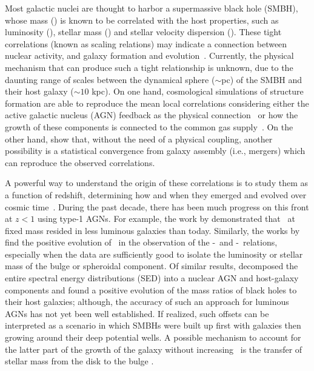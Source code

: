 \documentclass[apj]{emulateapj}
\begin{document}
Most galactic nuclei are thought to harbor a supermassive black hole (SMBH), whose mass (\mbh) is known to be correlated with the host properties, such as luminosity (\lhost), stellar mass (\smass) and stellar velocity dispersion (\sigstar). These tight correlations (known as scaling relations) may indicate a connection between nuclear activity, and galaxy formation and evolution~\citep[e.g.,][]{Mag++98, F+M00, M+H03, Gul++09,Beifi2012, H+R04, Geb++01b, Gra++2011}.
Currently, the physical mechanism that can produce such a tight relationship is unknown, due to the daunting range of scales between the dynamical sphere ($\sim$pc) of the SMBH and their host galaxy ($\sim10$ kpc). On one hand, cosmological simulations of structure formation are able to reproduce the mean local correlations considering either the active galactic nucleus (AGN) feedback as the physical connection~\citep{Springel2005, Hopkins2008, Matteo2008, DeG++15} or how the growth of these components is connected to the common gas supply~\citep{Cen2015, Menci2016}.
On the other hand, \citet{Peng2007, Jahnke2011, Hirschmann2010} show that, without the need of a physical coupling, another possibility is a statistical convergence from galaxy assembly (i.e., mergers) which can reproduce the observed correlations.

A powerful way to understand the origin of these correlations is to study them as a function of redshift, determining how and when they emerged and evolved over cosmic time~\citep[e.g.,][]{TMB04,Sal++06,Woo++06, Jah++09,SS13,Sun2015}. During the past decade, there has been much progress on this front at $z<1$ using type-1 AGNs. For example, the work by \citet{Park15, Tre++07, Pen++06qsob} demonstrated that \mbh\ at fixed mass resided in less luminous galaxies than today. Similarly, the works by \citet{Bennert11, Woo++08} find the positive evolution of \mbh\ in the observation of the \mbh-\smass\ and \mbh-\sigstar\ relations, especially when the data are sufficiently good to isolate the luminosity or stellar mass of the bulge or spheroidal component. Of similar results, \citet{Merloni2010} decomposed the entire spectral energy distributions (SED) into a nuclear AGN and host-galaxy components and found a positive evolution of the mass ratios of black holes to their host galaxies; although, the accuracy of such an approach for luminous AGNs has not yet been well established. If realized, such offsets can be interpreted as a scenario in which SMBHs were built up first with galaxies then growing around their deep potential wells.  A possible mechanism to account for the latter part of the growth of the galaxy without increasing \mbh\ is the transfer of stellar mass from the disk to the bulge \citep{Bennert++2011}. 
\end{document}
